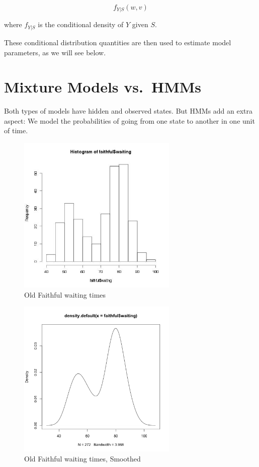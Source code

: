 \documentclass[11pt]{article}
\begin{document}
\begin{equation}
f_{Y|S} (w,v) 
\end{equation}

where $f_{Y|S}$ is the conditional density of $Y$ given $S$.

These conditional distribution quantities are then used to estimate
model parameters, as we will see below.

\section{Mixture Models vs.\ HMMs}

Both types of models have hidden and observed states.  But HMMs add an
extra aspect:  We model the probabilities of going from one state to
another in one unit of time.

\begin{figure}[tb]
\centerline{
\includegraphics[width=3.0in]{Faithful.jpg}
}
\caption{Old Faithful waiting times}
\label{faithfulhist}
\end{figure}

\begin{figure}[tb]
\centerline{
\includegraphics[width=3.0in]{FaithfulSmooth.png}
}
\caption{Old Faithful waiting times, Smoothed}
\label{faithfulhistsmooth}
\end{figure}
\end{document}
